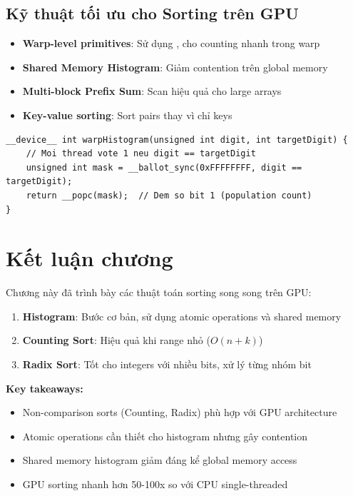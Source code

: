 \subsection{Kỹ thuật tối ưu cho Sorting trên GPU}

\begin{itemize}
    \item \textbf{Warp-level primitives}: Sử dụng ,  cho counting nhanh trong warp
    \item \textbf{Shared Memory Histogram}: Giảm contention trên global memory
    \item \textbf{Multi-block Prefix Sum}: Scan hiệu quả cho large arrays
    \item \textbf{Key-value sorting}: Sort pairs thay vì chỉ keys
\end{itemize}

\begin{lstlisting}[caption={Warp-level ballot counting}, label={lst:warp_ballot}]
__device__ int warpHistogram(unsigned int digit, int targetDigit) {
    // Moi thread vote 1 neu digit == targetDigit
    unsigned int mask = __ballot_sync(0xFFFFFFFF, digit == targetDigit);
    return __popc(mask);  // Dem so bit 1 (population count)
}
\end{lstlisting}

\section{Kết luận chương}

Chương này đã trình bày các thuật toán sorting song song trên GPU:

\begin{enumerate}
    \item \textbf{Histogram}: Bước cơ bản, sử dụng atomic operations và shared memory
    \item \textbf{Counting Sort}: Hiệu quả khi range nhỏ ($O(n + k)$)
    \item \textbf{Radix Sort}: Tốt cho integers với nhiều bits, xử lý từng nhóm bit
\end{enumerate}

\textbf{Key takeaways:}
\begin{itemize}
    \item Non-comparison sorts (Counting, Radix) phù hợp với GPU architecture
    \item Atomic operations cần thiết cho histogram nhưng gây contention
    \item Shared memory histogram giảm đáng kể global memory access
    \item GPU sorting nhanh hơn 50-100x so với CPU single-threaded
\end{itemize}

